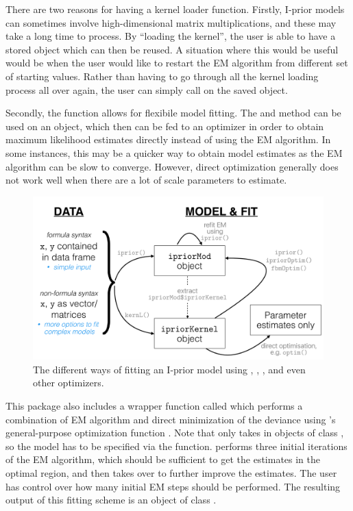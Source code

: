 There are two reasons for having a kernel loader function. Firstly, I-prior models can sometimes involve high-dimensional matrix multiplications, and these may take a long time to process. By ``loading the kernel'', the user is able to have a stored  object which can then be reused. A situation where this would be useful would be when the user would like to restart the EM algorithm from different set of starting values. Rather than having to go through all the kernel loading process all over again, the user can simply call on the saved  object.

Secondly, the  function allows for flexibile model fitting. The  and  method can be used on an  object, which then can be fed to an optimizer in order to obtain maximum likelihood estimates directly instead of using the EM algorithm. In some instances, this may be a quicker way to obtain model estimates as the EM algorithm can be slow to converge. However, direct optimization generally does not work well when there are a lot of scale parameters to estimate.

\begin{figure}[hbt]
  \centering
  \includegraphics[scale=0.2]{figure/ipriorways.pdf}
  \caption{The different ways of fitting an I-prior model using , , ,  and even other  optimizers.}
\end{figure}
\label{sec:iprioroptim}
This package also includes a wrapper function called  which performs a combination of EM algorithm and direct minimization of the deviance using 's general-purpose optimization function . Note that  only takes in objects of class , so the model has to be specified via the  function.  performs three initial iterations of the EM algorithm, which should be sufficient to get the estimates in the optimal region, and then  takes over to further improve the estimates. The user has control over how many initial EM steps should be performed. The resulting output of this fitting scheme is an object of class .

